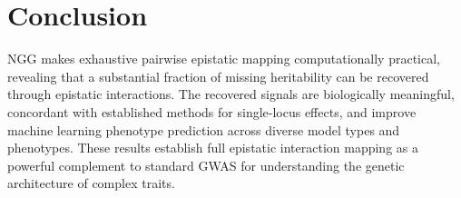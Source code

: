 \documentclass[11pt]{article}
\begin{document}
\section{Conclusion}

NGG makes exhaustive pairwise epistatic mapping computationally practical, revealing that a substantial fraction of missing heritability can be recovered through epistatic interactions. The recovered signals are biologically meaningful, concordant with established methods for single-locus effects, and improve machine learning phenotype prediction across diverse model types and phenotypes. These results establish full epistatic interaction mapping as a powerful complement to standard GWAS for understanding the genetic architecture of complex traits.



\end{document}
